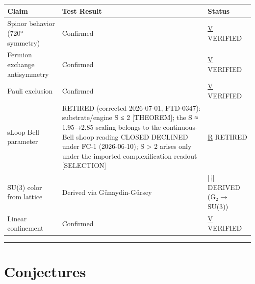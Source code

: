 \documentclass[
  11pt,
  letterpaper,
  twoside,
  openany]{book}
\makeatletter
\let\orig@section\section
\renewcommand{\section}{\needspace{8\baselineskip}\orig@section}
\makeatother
\begin{document}
\begin{longtable}[]{@{}
  >{\raggedright\arraybackslash}p{}
  >{\raggedright\arraybackslash}p{}
  >{\raggedright\arraybackslash}p{}@{}}
\toprule\noalign{}
\begin{minipage}[b]{\linewidth}\raggedright
Claim
\end{minipage} & \begin{minipage}[b]{\linewidth}\raggedright
Test Result
\end{minipage} & \begin{minipage}[b]{\linewidth}\raggedright
Status
\end{minipage} \\
\midrule\noalign{}
\endhead
\bottomrule\noalign{}
\endlastfoot
Spinor behavior (720° symmetry) & Confirmed & \hyperref[v]{V}
VERIFIED \\
Fermion exchange antisymmetry & Confirmed & \hyperref[v]{V} VERIFIED \\
Pauli exclusion & Confirmed & \hyperref[v]{V} VERIFIED \\
sLoop Bell parameter & RETIRED (corrected 2026-07-01, FTD-0347):
substrate/engine S ≤ 2 {[}THEOREM{]}; the S ≈ 1.95→2.85 scaling belongs
to the continuous-Bell sLoop reading CLOSED DECLINED under FC-1
(2026-06-10); S \textgreater{} 2 arises only under the imported
complexification readout {[}SELECTION{]} & \hyperref[r]{R} RETIRED \\
SU(3) color from lattice & Derived via Günaydin-Gürsey & {[}†{]} DERIVED
(G₂ → SU(3)) \\
Linear confinement & Confirmed & \hyperref[v]{V} VERIFIED \\
\end{longtable}

\begin{center}\rule{0.5\linewidth}{0.5pt}\end{center}

\section{Conjectures}\label{conjectures}
\end{document}
